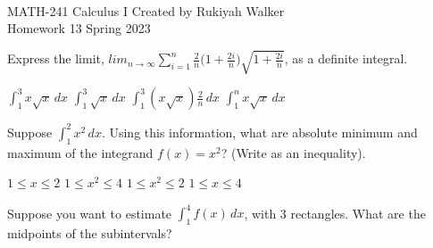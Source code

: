 \documentclass[addpoints, 12pt]{exam}%
\newcommand{\spc}{\vspace*{0.5cm}}
\begin{document}
\noindent \hrulefill \\
	MATH-241 Calculus I \hfill Created by Rukiyah Walker\\
	Homework 13 \hfill Spring 2023\\ \vspace*{-1cm}
 
	\noindent\hrulefill


\begin{questions}

\vspace*{0.5cm}

\question[1]

Express the limit, $lim_{n \to \infty} \sum_{i=1}^{n}  \frac{2}{n} \big( 1 + \frac{2i}{n} \big) \sqrt{1 + \frac{2i}{n}}$, as a definite integral. 

\begin{multicols}{2}
\begin{choices}
\CorrectChoice $\int_{1}^{3} x\sqrt{x} \,dx$
\choice $\int_{1}^{3} \sqrt{x} \,dx$
\choice $\int_{1}^{3} (x\sqrt{x})\frac{2}{n} \,dx$
\choice $\int_{1}^{n} x\sqrt{x} \,dx$
\end{choices}
\end{multicols}

\spc

\question[1]

Suppose $\int_{1}^{2} x^2 \,dx$. Using this information, what are absolute minimum and maximum of the integrand $f(x) = x^2$? (Write as an inequality).

\begin{multicols}{2}
\begin{choices}
\choice $1 \leq x \leq 2$
\CorrectChoice $1 \leq x^2 \leq 4$
\choice $1 \leq x^2 \leq 2$
\choice $1 \leq x \leq 4$
\end{choices}
\end{multicols}

\spc

\question[1]

Suppose you want to estimate $\int_{1}^{4} f(x) \,dx$, with 3 rectangles. What are the midpoints of the subintervals?


\end{questions}
\end{document}
